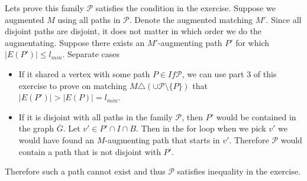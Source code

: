 \begin{exercise}{2}
\begin{enumerate}[i)]
{            Lets prove this family $\mathcal{P}$ satisfies the condition in the
            exercise. Suppose we augmented $M$ using all paths in $\mathcal{P}$.
            Denote the augmented matching $M'$. Since all disjoint paths are
            disjoint, it does not matter in which order we do the augmentating.
            Suppose there exists an $M'$-augmenting path $P'$ for which $|E(P')|
            \leq l_{min}$. Separate cases
            \begin{itemize}
                \item{If it shared a vertex with some path $P \in If
                    \mathcal{P}$, we can use part 3 of this exercise to prove on
                    matching $M \triangle (\cup \mathcal{P} \setminus \{P\})$
                    that $|E(P')| > |E(P)| = l_{min}$.}
                \item{If it is disjoint with all paths in the family
                    $\mathcal{P}$, then $P'$ would be contained in the graph
                    $\overline{G}$. Let $v' \in P' \cap I \cap B$. Then in the
                    for loop when we pick $v'$ we would have found an
                    $M$-augmenting path that starts in $v'$. Therefore
                    $\mathcal{P}$ would contain a path that is not disjoint with
                    $P'$.}
            \end{itemize}
            Therefore such a path cannot exist and thus $\mathcal{P}$ satisfies
            inequality in the exercise.



}
\end{enumerate}
\end{exercise}

